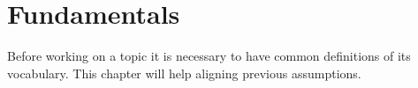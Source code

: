 \chapter{Fundamentals}

Before working on a topic it is necessary to have common definitions of its vocabulary. This chapter will help aligning previous assumptions.
